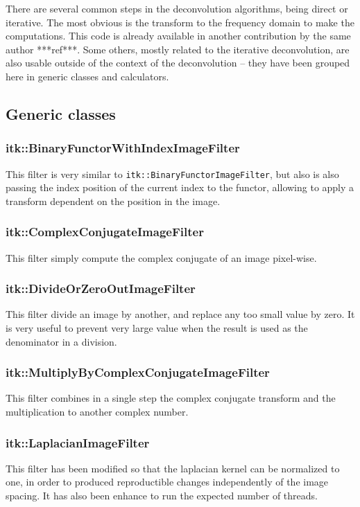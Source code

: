 \documentclass{InsightArticle}
\begin{document}
There are several common steps in the deconvolution algorithms, being direct or iterative. The most obvious is the transform
to the frequency domain to make the computations. This code is already available in another contribution by the same author ***ref***.
Some others, mostly related to the iterative deconvolution, are also usable outside of the context of the deconvolution -- they
have been grouped here in generic classes and calculators.

\subsection{Generic classes}

\subsubsection{itk::BinaryFunctorWithIndexImageFilter}
This filter is very similar to \verb$itk::BinaryFunctorImageFilter$, but also is also passing the index position of the
current index to the functor, allowing to apply a transform dependent on the position in the image.

\subsubsection{itk::ComplexConjugateImageFilter}
This filter simply compute the complex conjugate of an image pixel-wise.

\subsubsection{itk::DivideOrZeroOutImageFilter}
This filter divide an image by another, and replace any too small value by zero. It is very useful to prevent very large value
when the result is used as the denominator in a division.

\subsubsection{itk::MultiplyByComplexConjugateImageFilter}
This filter combines in a single step the complex conjugate transform and the multiplication to another complex number.

\subsubsection{itk::LaplacianImageFilter}
This filter has been modified so that the laplacian kernel can be normalized to one, in order to produced reproductible changes
independently of the image spacing. It has also been enhance to run the expected number of threads.
\end{document}
